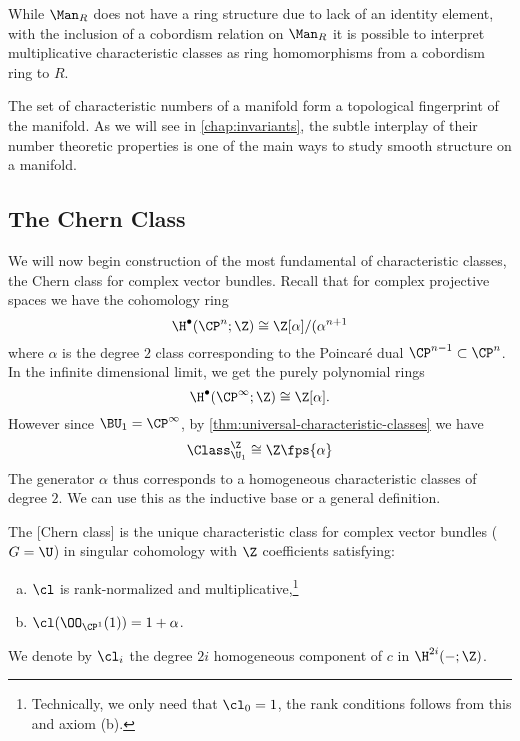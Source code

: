 \begin{remark}
	While $\Man_R$ does not have a ring structure due to lack of an identity element, with the inclusion of a cobordism relation on $\Man_R$ it is possible to interpret multiplicative characteristic classes as ring homomorphisms from a cobordism ring to $R$.
\end{remark}

The set of characteristic numbers of a manifold form a topological fingerprint of the manifold. As we will see in \cref{chap:invariants}, the subtle interplay of their number theoretic properties is one of the main ways to study smooth structure on a manifold.

\subsection{The Chern Class}

We will now begin construction of the most fundamental of characteristic classes, the Chern class for complex vector bundles. Recall that for complex projective spaces we have the cohomology ring
\[
	\H^\bullet(\CP^n;\Z)\cong \Z[\alpha]/(\alpha^{n+1}
\]
where $\alpha$ is the degree $2$ class corresponding to the Poincar\'e dual $\CP^{n-1}\subset \CP^n$.
In the infinite dimensional limit, we get the purely polynomial rings
\[
	\H^\bullet(\CP^\infty;\Z)\cong \Z[\alpha].
\]
However since $\BU_1=\CP^\infty$, by \cref{thm:universal-characteristic-classes} we have
\begin{equation}\label{eq:cczu1-a}
	\Class_{\U_1}^{\Z}\cong \Z\fps{\alpha}
\end{equation}
The generator $\alpha$ thus corresponds to a homogeneous characteristic classes of degree $2$. We can use this as the inductive base or a general definition.

\begin{definition}
	The [Chern class] is the unique characteristic class for complex vector bundles ($G=\U$) in singular cohomology with $\Z$ coefficients satisfying:
	\begin{enumerate}[(a)]
		\item $\cl$ is rank-normalized and multiplicative,\footnote{Technically, we only need that $\cl_0=1$, the rank conditions follows from this and axiom (b).}
		\item $\cl(\OO_{\CP^1}(1))=1+\alpha$.
	\end{enumerate}
	We denote by $\cl_i$ the degree $2i$ homogeneous component of $c$ in $\H^{2i}(-;\Z)$.
\end{definition}

